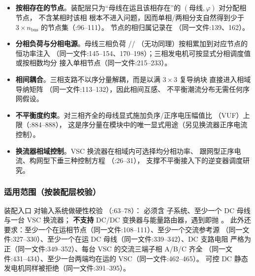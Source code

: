 \begin{itemize}
  \item \textbf{按相存在的节点}。装配层只为“母线在运且该相存在”的
        $(\text{母线},\varphi)$ 对分配相节点， 不含某相时该相
        根本不进入问题，因而单相/两相分支自然得到少于 $3\times n_{\mathrm{bus}}$
        的节点集（:96--111）。
        节点的相归属记录在 （同一文件:139、162）。
  \item \textbf{分相负荷与分相电源}。母线三相负荷 //%
        （无功同理）按相累加到对应节点的恒功率注入
        （同一文件:145--154、170--198）；三相发电机可按显式分相调度值或按相数均分
        接入单相节点（同一文件:215--233）。
  \item \textbf{相间耦合}。三相支路不以序分量解耦，而是以满 $3\times 3$ 复导纳块
        直接进入相域导纳矩阵 （同一文件:113--132），因此相间互感、
        不平衡潮流分布无需任何序网假设。
  \item \textbf{不平衡度约束}。对三相齐全的母线显式施加负序/正序电压幅值比
        （VUF）上限（:884--888），
        这是序分量在模块中的唯一显式用途（另见换流器正序电流控制）。
  \item \textbf{换流器相域控制}。VSC 换流器在相域内可选择均分相功率、
        跟网型正序电流、构网型下垂三种控制方程
        （:26--31），
        支撑不平衡接入下的逆变器调度研究。
\end{itemize}

\subsubsection*{适用范围（按装配层校验）}
装配入口  对输入系统做硬性校验
（:63--78）：
必须含  子系统、至少一个 DC 母线与一台 VSC 换流器；
\textbf{不支持} DC/DC 变换器与能量路由器，遇到即抛 。
此外还要求：至少一个在运相节点（同一文件:108--111）、至少一个交流参考源
（同一文件:327--330）、至少一个在运 DC 母线（同一文件:339--342）、DC 支路电阻
严格为正（同一文件:349--352）、每台 VSC 的交流三端子相 A/B/C 齐全
（同一文件:431--434）、至少一台两端均在运的 VSC（同一文件:462--465）。
可控 DC 静态发电机同样被拒绝（同一文件:391--395）。

